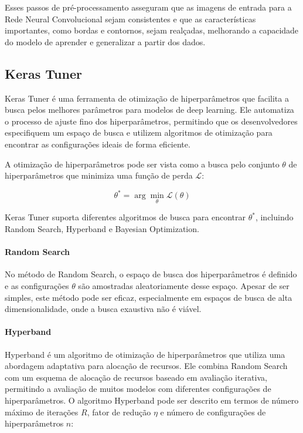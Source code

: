 \documentclass{article}
\begin{document}
Esses passos de pré-processamento asseguram que as imagens de entrada para a Rede Neural Convolucional sejam consistentes e que as características importantes, como bordas e contornos, sejam realçadas, melhorando a capacidade do modelo de aprender e generalizar a partir dos dados.

\subsection{Keras Tuner}

Keras Tuner é uma ferramenta de otimização de hiperparâmetros que facilita a busca pelos melhores parâmetros para modelos de deep learning. Ele automatiza o processo de ajuste fino dos hiperparâmetros, permitindo que os desenvolvedores especifiquem um espaço de busca e utilizem algoritmos de otimização para encontrar as configurações ideais de forma eficiente.

A otimização de hiperparâmetros pode ser vista como a busca pelo conjunto \( \theta \) de hiperparâmetros que minimiza uma função de perda \( \mathcal{L} \):

\[
\theta^* = \arg \min_{\theta} \mathcal{L}(\theta)
\]

Keras Tuner suporta diferentes algoritmos de busca para encontrar \( \theta^* \), incluindo Random Search, Hyperband e Bayesian Optimization.

\paragraph{Random Search}

No método de Random Search, o espaço de busca dos hiperparâmetros é definido e as configurações \( \theta \) são amostradas aleatoriamente desse espaço. Apesar de ser simples, este método pode ser eficaz, especialmente em espaços de busca de alta dimensionalidade, onde a busca exaustiva não é viável.

\paragraph{Hyperband}

Hyperband é um algoritmo de otimização de hiperparâmetros que utiliza uma abordagem adaptativa para alocação de recursos. Ele combina Random Search com um esquema de alocação de recursos baseado em avaliação iterativa, permitindo a avaliação de muitos modelos com diferentes configurações de hiperparâmetros. O algoritmo Hyperband pode ser descrito em termos de número máximo de iterações \( R \), fator de redução \( \eta \) e número de configurações de hiperparâmetros \( n \):
\end{document}

